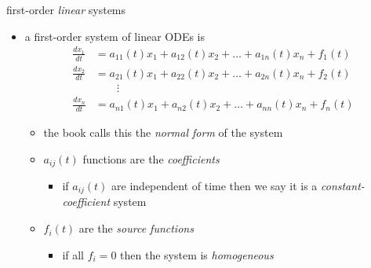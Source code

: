 \documentclass[dvipsnames,colorlinks]{beamer}
\begin{document}
\begin{frame}{first-order \emph{linear} systems}

\begin{itemize}
\item a \alert{first-order system of linear ODEs} is
\begin{align*}
\frac{dx_1}{dt} &= a_{11}(t) x_1 + a_{12}(t) x_2 + \dots + a_{1n}(t) x_n + f_1(t) \\
\frac{dx_2}{dt} &= a_{21}(t) x_1 + a_{22}(t) x_2 + \dots + a_{2n}(t) x_n + f_2(t) \\
                &\qquad \vdots \\
\frac{dx_n}{dt} &= a_{n1}(t) x_1 + a_{n2}(t) x_2 + \dots + a_{nn}(t) x_n + f_n(t)
\end{align*}
     \begin{itemize}
     \item the book calls this the \emph{normal form} of the system

\smallskip
     \item $a_{ij}(t)$ functions are the \emph{coefficients}
         \begin{itemize}
         \item if $a_{ij}(t)$ are independent of time then we say it is a \emph{constant-coefficient} system
         \end{itemize}
     \item $f_i(t)$ are the \emph{source functions}
         \begin{itemize}
         \item if all $f_i=0$ then the system is \emph{homogeneous}
         \end{itemize}
     \end{itemize}
\end{itemize}
\end{frame}
\end{document}
